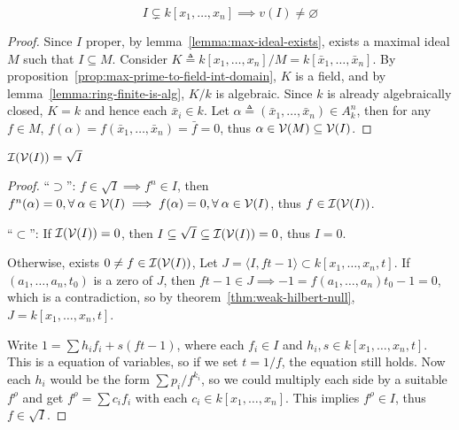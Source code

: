 \begin{theorem} \label{thm:weak-hilbert-null}
  \[ I \subsetneq k[x_1, \dots, x_n] \implies v(I) \neq \varnothing \]

  \begin{proof}
    Since $I$ proper, by lemma~\ref{lemma:max-ideal-exists},
    exists a maximal ideal $M$ such that $I \subseteq M$.
    Consider $K \triangleq k[x_1, \dots, x_n] / M = k[\bar{x}_1, \dots, \bar{x}_n]$.
    By proposition~\ref{prop:max-prime-to-field-int-domain}, $K$ is a field,
    and by lemma~\ref{lemma:ring-finite-is-alg}, $K/k$ is algebraic. Since $k$
    is already algebraically closed, $K = k$ and hence each $\bar{x}_i \in k$.
    Let $\alpha \triangleq (\bar{x}_1, \dots, \bar{x}_n) \in A_k^n$, then
    for any $f \in M$, $f(\alpha) = f(\bar{x}_1, \dots, \bar{x}_n) = \bar{f} = 0$,
    thus $\alpha \in \mathcal{V}(M) \subseteq \mathcal{V}(I)$.
  \end{proof}
\end{theorem}

\begin{theorem}
  $\mathcal{I}(\mathcal{V}(I)) = \sqrt{I}$

  \begin{proof}
    ``$\supset$'': $f \in \sqrt{I} \implies f^n \in I$, then
    $f^n(\alpha) = 0, \forall \alpha \in \Vc(I)
    \implies f(\alpha) = 0, \forall \alpha \in \Vc(I)$, thus $f \in \mathcal{I}(\mathcal{V}(I))$.

    ``$\subset$'': If $\mathcal{I}(\mathcal{V}(I)) = 0$, then $I \subseteq \sqrt{I} \subseteq \mathcal{I}(\mathcal{V}(I)) = 0$,
    thus $I = 0$.

    Otherwise, exists $0 \neq f \in \mathcal{I}(\mathcal{V}(I))$, Let $J = \langle I, ft-1 \rangle \subset k[x_1, \dots, x_n, t]$.
    If $(a_1, \dots, a_n, t_0)$ is a zero of $J$, then $ft-1 \in J \implies -1 = f(a_1, \dots, a_n) t_0 - 1 =
    0$, which is a contradiction, so by theorem~\ref{thm:weak-hilbert-null}, $J = k[x_1, \dots, x_n, t]$.

    Write $1 = \sum h_i f_i + s (ft-1)$, where each $f_i \in I$ and
    $h_i, s \in k[x_1, \dots, x_n, t]$.
    This is a equation of variables, so if we set $t = 1/f$, the equation still holds.
    Now each $h_i$ would be the form $\sum p_i / f^{k_i}$, so we could multiply each
    side by a suitable $f^\rho$ and get $f^\rho = \sum c_i f_i$ with each $c_i \in k[x_1, \dots, x_n]$.
    This implies $f^\rho \in I$, thus $f \in \sqrt{I}$.
  \end{proof}
\end{theorem}

